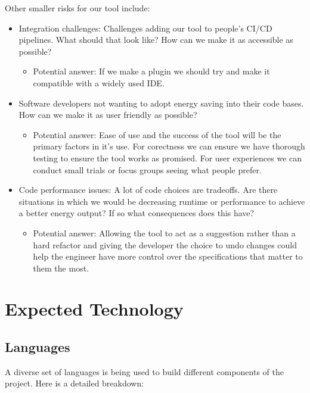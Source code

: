 \documentclass{article}
\begin{document}
Other smaller risks for our tool include:
\begin{itemize}
  \item Integration challenges: Challenges adding our tool to people's CI/CD pipelines. What should that look like? How can we make it as accessible as possible? 
  \begin{itemize}
    \item Potential answer: If we make a plugin we should try and make it compatible with a widely used IDE.
  \end{itemize} 
  \item Software developers not wanting to adopt energy saving into their code bases. How can we make it as user friendly as possible?
  \begin{itemize}
    \item Potential answer: Ease of use and the success of the tool will be the primary factors in it's use. For corectness we can ensure we have thorough testing to ensure the tool works as promised. For user experiences we can conduct small trials or focus groups seeing what people prefer.  
  \end{itemize} 
  \item Code performance issues: A lot of code choices are tradeoffs. Are there situations in which we would be decreasing runtime or performance to achieve a better energy output? If so what consequences does this have?
  \begin{itemize}
    \item Potential answer: Allowing the tool to act as a suggestion rather than a hard refactor and giving the developer the choice to undo changes could help the engineer have more control over the specifications that matter to them the most. 
  \end{itemize} 
\end{itemize} 

\section{Expected Technology}

\subsection{Languages}
A diverse set of languages is being used to build different components of the project. Here is a detailed breakdown:
\end{document}
